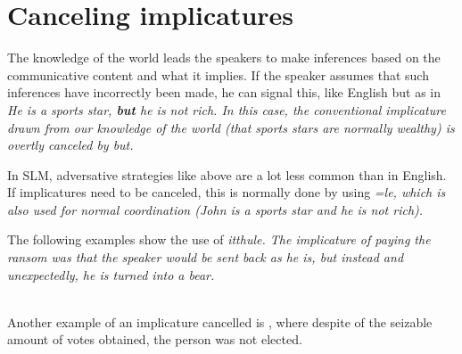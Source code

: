 \section{Canceling implicatures}\label{sec:disc:Cancelingimplicatures}
The knowledge of the world leads the speakers to make inferences based on the communicative content and what it implies. If the speaker assumes that such inferences have incorrectly been made, he can signal this, like English but as in \em He is a sports star, \textbf{but} he is not rich\em. In this case, the conventional implicature drawn from our knowledge of the world (that sports stars are normally wealthy) is overtly canceled by \em but\em.

In SLM, adversative strategies like above are a lot less common than in English. If implicatures need to be canceled, this is normally done by using \em =le\em, which is also used for normal coordination (\em John is a sports star and he is not rich\em).

The following examples show the use of \em itthule\em. The implicature of paying the ransom was that the speaker would be sent back as he is, but instead and unexpectedly, he is turned into a bear.
 
\\

Another example of an implicature cancelled is , where despite of the seizable amount of votes obtained, the person was not elected.

 \\

